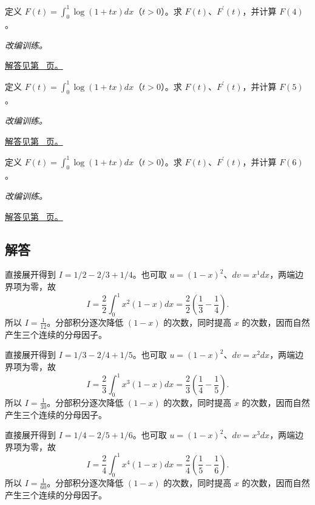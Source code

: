 \documentclass[12pt,fontset=fandol]{ctexart}
\begin{document}
\begin{example}[简单含参积分的求导]\label{ex:c20q22}
定义 $F(t)=\int_0^1\log(1+tx)dx$（$t>0$）。求 $F(t)$、$F^{\prime}(t)$，并计算 $F(4)$。
\par\textit{改编训练。}\par\hyperref[ans:c20q22]{解答见第~\pageref{ans:c20q22} 页。}
\end{example}
\begin{example}[简单含参积分的求导]\label{ex:c20q23}
定义 $F(t)=\int_0^1\log(1+tx)dx$（$t>0$）。求 $F(t)$、$F^{\prime}(t)$，并计算 $F(5)$。
\par\textit{改编训练。}\par\hyperref[ans:c20q23]{解答见第~\pageref{ans:c20q23} 页。}
\end{example}
\begin{example}[简单含参积分的求导]\label{ex:c20q24}
定义 $F(t)=\int_0^1\log(1+tx)dx$（$t>0$）。求 $F(t)$、$F^{\prime}(t)$，并计算 $F(6)$。
\par\textit{改编训练。}\par\hyperref[ans:c20q24]{解答见第~\pageref{ans:c20q24} 页。}
\end{example}
\subsection{解答}
\begin{solve}\label{ans:c20q1}
直接展开得到 $I=1/2-2/3+1/4$。也可取 $u=(1-x)^2$、$dv=x^{1}dx$，两端边界项为零，故
\[
I=\frac2{2}\int_0^1x^{2}(1-x)dx=\frac2{2}\left(\frac1{3}-\frac1{4}\right).
\]
所以 $I=\frac{1}{12}$。分部积分逐次降低 $(1-x)$ 的次数，同时提高 $x$ 的次数，因而自然产生三个连续的分母因子。
\end{solve}

\begin{solve}\label{ans:c20q2}
直接展开得到 $I=1/3-2/4+1/5$。也可取 $u=(1-x)^2$、$dv=x^{2}dx$，两端边界项为零，故
\[
I=\frac2{3}\int_0^1x^{3}(1-x)dx=\frac2{3}\left(\frac1{4}-\frac1{5}\right).
\]
所以 $I=\frac{1}{30}$。分部积分逐次降低 $(1-x)$ 的次数，同时提高 $x$ 的次数，因而自然产生三个连续的分母因子。
\end{solve}

\begin{solve}\label{ans:c20q3}
直接展开得到 $I=1/4-2/5+1/6$。也可取 $u=(1-x)^2$、$dv=x^{3}dx$，两端边界项为零，故
\[
I=\frac2{4}\int_0^1x^{4}(1-x)dx=\frac2{4}\left(\frac1{5}-\frac1{6}\right).
\]
所以 $I=\frac{1}{60}$。分部积分逐次降低 $(1-x)$ 的次数，同时提高 $x$ 的次数，因而自然产生三个连续的分母因子。
\end{solve}
\end{document}
